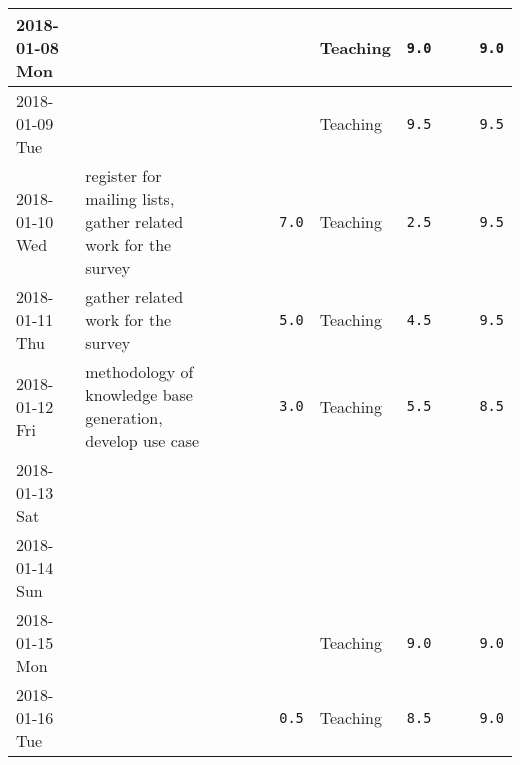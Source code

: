 \documentclass[10pt,a4paper,landscape]{article}
\def\tuwBlue{tuwBlue}
\begin{document}
{\begin{tabular}{|l||p{65mm}|c|c|c|r||p{30mm}|r||p{30mm}|r||r|}
    \rowcolor{\tuwBlue!5!white}
    2018-01-08 Mon &  &  &  &  & \cellcolor{\tuwBlue!20!white}  & Teaching & \cellcolor{\tuwBlue!20!white} \texttt{9.0} &  & \cellcolor{\tuwBlue!20!white}  & \cellcolor{\tuwBlue!40!white} \texttt{9.0}
      \\ \hline
    
    \rowcolor{\tuwBlue!5!white}
    2018-01-09 Tue &  &  &  &  & \cellcolor{\tuwBlue!20!white}  & Teaching & \cellcolor{\tuwBlue!20!white} \texttt{9.5} &  & \cellcolor{\tuwBlue!20!white}  & \cellcolor{\tuwBlue!40!white} \texttt{9.5}
      \\ \hline
    
    \rowcolor{\tuwBlue!5!white}
    2018-01-10 Wed & register for mailing lists, gather related work for the survey &  &  &  & \cellcolor{\tuwBlue!20!white} \texttt{7.0} & Teaching & \cellcolor{\tuwBlue!20!white} \texttt{2.5} &  & \cellcolor{\tuwBlue!20!white}  & \cellcolor{\tuwBlue!40!white} \texttt{9.5}
      \\ \hline
    
    \rowcolor{\tuwBlue!5!white}
    2018-01-11 Thu & gather related work for the survey &  &  &  & \cellcolor{\tuwBlue!20!white} \texttt{5.0} & Teaching & \cellcolor{\tuwBlue!20!white} \texttt{4.5} &  & \cellcolor{\tuwBlue!20!white}  & \cellcolor{\tuwBlue!40!white} \texttt{9.5}
      \\ \hline
    
    \rowcolor{\tuwBlue!5!white}
    2018-01-12 Fri & methodology of knowledge base generation, develop use case &  &  &  & \cellcolor{\tuwBlue!20!white} \texttt{3.0} & Teaching & \cellcolor{\tuwBlue!20!white} \texttt{5.5} &  & \cellcolor{\tuwBlue!20!white}  & \cellcolor{\tuwBlue!40!white} \texttt{8.5}
      \\ \hline
    
    \rowcolor{lightgray}
    2018-01-13 Sat &  &  &  &  &  &  &  &  &  & 
      \\ \hline
    
    \rowcolor{lightgray}
    2018-01-14 Sun &  &  &  &  &  &  &  &  &  & 
      \\ \hline
    
    \rowcolor{\tuwBlue!5!white}
    2018-01-15 Mon &  &  &  &  & \cellcolor{\tuwBlue!20!white}  & Teaching & \cellcolor{\tuwBlue!20!white} \texttt{9.0} &  & \cellcolor{\tuwBlue!20!white}  & \cellcolor{\tuwBlue!40!white} \texttt{9.0}
      \\ \hline
    
    \rowcolor{\tuwBlue!5!white}
    2018-01-16 Tue &  &  &  &  & \cellcolor{\tuwBlue!20!white} \texttt{0.5} & Teaching & \cellcolor{\tuwBlue!20!white} \texttt{8.5} &  & \cellcolor{\tuwBlue!20!white}  & \cellcolor{\tuwBlue!40!white} \texttt{9.0}
      \\ \hline
    

\end{tabular}}
\end{document}
